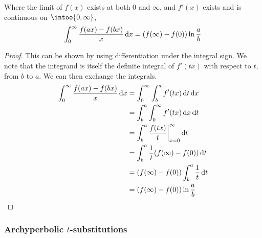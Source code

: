 \begin{theorem}
    Where the limit of \(f(x)\) exists at both 0 and \(\infty\), and \(f'(x)\)
    exists and is continuous on \(\intoo{0, \infty}\),
    \begin{equation*}
        \integ[0]<\infty>{\frac{f(ax) - f(bx)} x}{x}
        = (f(\infty) - f(0))\ln \frac ab
    \end{equation*}
\end{theorem}
\begin{proof}
    This can be shown by using differentiation under the integral sign. We note
    that the integrand is itself the definite integral of \(f'(tx)\) with
    respect to \(t\), from \(b\) to \(a\). We can then exchange the integrals.
    \begin{align*}
        \integ[0]<\infty>{\frac{f(ax) - f(bx)} x}{x} &=
        \integ[0]<\infty>{\integ[b]<a>{f'(tx)}{t}}{x} \\
        &= \integ[b]<a>{\integ[0]<\infty>{f'(tx)}{x}}{t} \\
        &= \integ[b]<a>{\frac{f(tx)}{t}\eval_{x=0}^\infty}{t} \\
        &= \integ[b]<a>{\frac 1t(f(\infty) - f(0))}{t} \\
        &= (f(\infty) - f(0))\integ[b]<a>{\frac 1t}{t} \\
        &= (f(\infty) - f(0))\ln \frac ab \qedhere
    \end{align*}
\end{proof}

\subsubsection[Archyperbolic \texorpdfstring{\(t\)}{t} substitutions]
              {Archyperbolic \boldmath\(t\)-substitutions}

